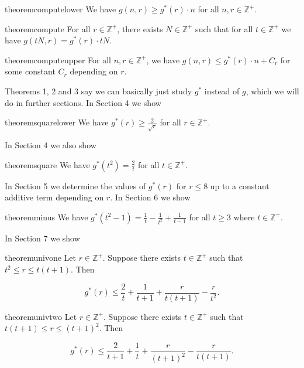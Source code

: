 \documentclass{article}
\begin{document}
\begin{restatable}{theorem}{computelower}
We have $g(n,r) \geq g^*(r) \cdot n$ for all $n,r \in \mathbb{Z}^{+}$.
\end{restatable}

\begin{restatable}{theorem}{compute}
For all $r \in \mathbb{Z}^{+}$, there exists $N \in \mathbb{Z}^{+}$ such that for all $t \in \mathbb{Z}^{+}$ we have $g(tN,r) = g^*(r) \cdot tN$.
\end{restatable}

\begin{restatable}{theorem}{computeupper}
For all $n,r \in \mathbb{Z}^{+}$, we have $g(n,r) \leq g^*(r) \cdot n + C_r$ for some constant $C_r$ depending on $r$. 
\end{restatable}

Theorems 1, 2 and 3 say we can basically just study $g^*$ instead of $g$, which we will do in further sections. In Section 4 we show

\begin{restatable}{theorem}{squarelower}
We have $g^*(r) \geq \frac{2}{\sqrt{r}}$ for all $r \in \mathbb{Z}^{+}$. 
\end{restatable}

\noindent
In Section 4 we also show 

\begin{restatable}{theorem}{square}
We have $g^*(t^2) = \frac{2}{t}$ for all $t \in \mathbb{Z}^{+}$. 
\end{restatable}

\noindent
 In Section 5 we determine the values of $g^*(r)$ for $r \leq 8$ up to a constant additive term depending on $r$. In Section 6 we show 

\begin{restatable}{theorem}{minus}
We have $g^*(t^2-1) = \frac{1}{t} - \frac{1}{t^2} + \frac{1}{t-1}$ for all $t \geq 3$ where $t \in \mathbb{Z}^{+}$.
\end{restatable}

\noindent
In Section 7 we show 

\begin{restatable}{theorem}{univone}
Let $r \in \mathbb{Z}^{+}$. Suppose there exists $t \in \mathbb{Z}^{+}$ such that $t^2 \leq r \leq t(t+1)$. Then

$$g^*(r) \leq  \frac{2}{t} + \frac{1}{t+1} + \frac{r}{t(t+1)} - \frac{r}{t^2}.$$
\end{restatable}

\begin{restatable}{theorem}{univtwo}
Let $r \in \mathbb{Z}^{+}$. Suppose there exists $t \in \mathbb{Z}^{+}$ such that $t(t+1) \leq r \leq (t+1)^2$. Then

$$g^*(r) \leq  \frac{2}{t+1}+\frac{1}{t}+\frac{r}{(t+1)^2}-\frac{r}{t(t+1)}.$$
\end{restatable}
\end{document}
